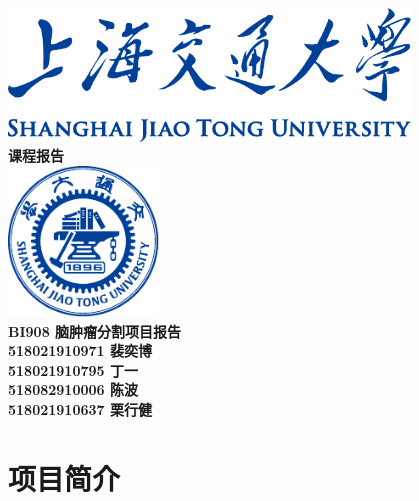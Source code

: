 \documentclass[UTF8]{ctexart}
\begin{document}
\begin{titlepage}
    \begin{center}
        \includegraphics[width=0.8\textwidth]{sjtu-name-blue.pdf}\\[1cm]
        \textsc{\Huge \bfseries 课程报告}\\[1.5cm]
        \includegraphics[width=0.3\textwidth]{sjtu-badge-blue.pdf}\\[0.5cm]    

        \Huge \bfseries{BI908 脑肿瘤分割项目报告}\\[1cm]
        \Large \bfseries{518021910971 裴奕博}\\
        \Large \bfseries{518021910795 丁一}\\
        \Large \bfseries{518082910006 陈波}\\
        \Large \bfseries{518021910637 栗行健}
    \end{center}
\end{titlepage}
\tableofcontents

\newpage
\section{项目简介}
\end{document}
